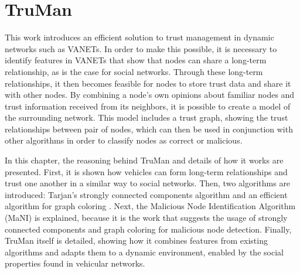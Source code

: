 \chapter{TruMan}
\label{chap:truman}

This work introduces an efficient solution to trust management in dynamic networks such as VANETs.
In order to make this possible, it is necessary to identify features in VANETs that show that nodes can share a long-term relationship, as is the case for social networks.
Through these long-term relationships, it then becomes feasible for nodes to store trust data and share it with other nodes.
By combining a node's own opinions about familiar nodes and trust information received from its neighbors, it is possible to create a model of the surrounding network.
This model includes a trust graph, showing the trust relationships between pair of nodes, which can then be used in conjunction with other algorithms in order to classify nodes as correct or malicious.


In this chapter, the reasoning behind TruMan and details of how it works are presented.
First, it is shown how vehicles can form long-term relationships and trust one another in a similar way to social networks.
Then, two algorithms are introduced: Tarjan's strongly connected components algorithm \citep{tarjan1972depth} and an efficient algorithm for graph coloring \citep{mittal2011graph}.
Next, the Malicious Node Identification Algorithm (MaNI) \citep{vernize2013dissertation} is explained, because it is the work that suggests the usage of strongly connected components and graph coloring for malicious node detection.
Finally, TruMan itself is detailed, showing how it combines features from existing algorithms and adapts them to a dynamic environment, enabled by the social properties found in vehicular networks.

